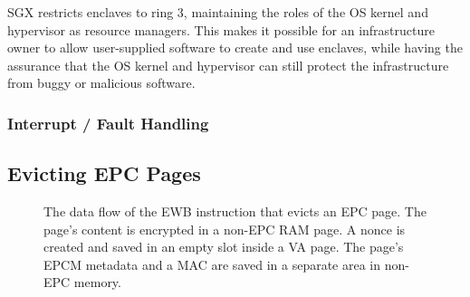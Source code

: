 SGX restricts enclaves to ring 3, maintaining the roles of the OS kernel and
hypervisor as resource managers. This makes it possible for an infrastructure
owner to allow user-supplied software to create and use enclaves, while having
the assurance that the OS kernel and hypervisor can still protect the
infrastructure from buggy or malicious software.




\subsubsection{Interrupt / Fault Handling}
\label{sec:aex}





\subsection{Evicting EPC Pages}
\label{sec:sgx_ewb}



\begin{figure}[hbt!]
  \caption{
    The data flow of the EWB instruction that evicts an EPC page. The page's
    content is encrypted in a non-EPC RAM page. A nonce is created and saved
    in an empty slot inside a VA page. The page's EPCM metadata and a MAC
    are saved in a separate area in non-EPC memory.
  }
  \label{fig:sgx_ewb}
\end{figure}


